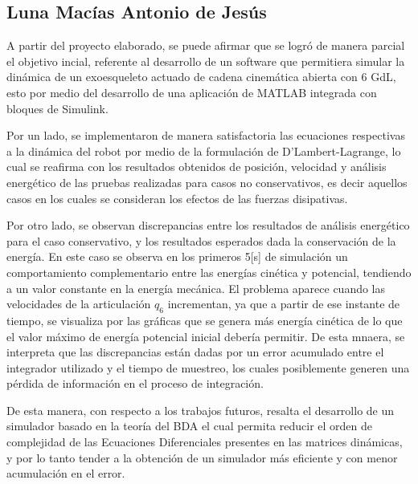 
\subsection{Luna Macías Antonio de Jesús}
    \noindent A partir del proyecto elaborado, se puede afirmar que se logró 
    de manera parcial el objetivo incial, referente al desarrollo 
    de un software que permitiera simular la dinámica de un exoesqueleto 
    actuado de cadena cinemática abierta con 6 GdL, esto por medio del desarrollo de 
    una aplicación de MATLAB integrada con bloques de Simulink.
    
    Por un lado, se implementaron de manera satisfactoria las ecuaciones 
    respectivas a la dinámica del robot por medio de la formulación de 
    D'Lambert-Lagrange, lo cual se reafirma con los resultados 
    obtenidos de posición, velocidad y análisis energético de las 
    pruebas realizadas para casos no conservativos, es decir 
    aquellos casos en los cuales se consideran los efectos de las fuerzas 
    disipativas. 

    Por otro lado, se observan discrepancias entre los resultados de análisis 
    energético para el caso conservativo, y los resultados esperados dada la conservación de 
    la energía. En este caso se observa en los primeros 5[s] de simulación un comportamiento 
    complementario entre las energías cinética y potencial, tendiendo a un valor 
    constante en la energía mecánica. El problema aparece cuando las velocidades 
    de la articulación $q_6$ incrementan, ya que a partir de ese instante de tiempo, se 
    visualiza por las gráficas que se genera más energía cinética de lo que el valor 
    máximo de energía potencial inicial debería permitir. De esta mnaera, se interpreta 
    que las discrepancias están dadas por un error acumulado entre el integrador 
    utilizado y el tiempo de muestreo, los cuales posiblemente generen una pérdida de información 
    en el proceso de integración.

    De esta manera, con respecto a los trabajos futuros, resalta el desarrollo de un 
    simulador basado en la teoría del BDA el cual permita reducir el orden de 
    complejidad de las Ecuaciones Diferenciales presentes en las matrices dinámicas, 
    y por lo tanto tender a la obtención de un simulador más eficiente y con 
    menor acumulación en el error.
